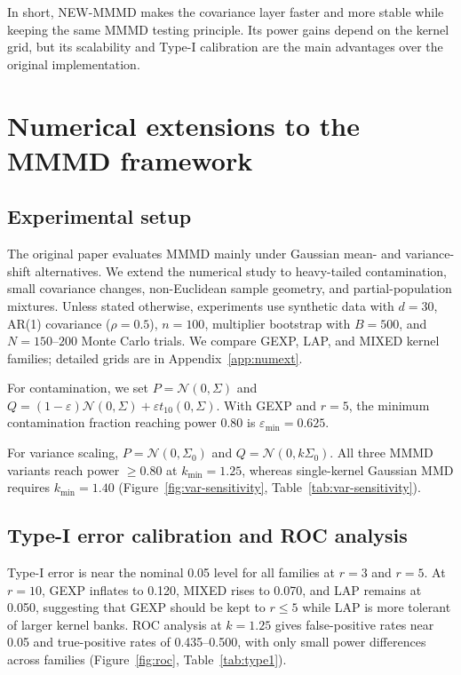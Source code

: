\documentclass[12pt]{article}
\begin{document}
In short, NEW-MMMD makes the covariance layer faster and more stable while keeping the same MMMD testing principle. Its power gains depend on the kernel grid, but its scalability and Type-I calibration are the main advantages over the original implementation.

\section{Numerical extensions to the MMMD framework}

\subsection{Experimental setup}

The original paper evaluates MMMD mainly under Gaussian mean- and variance-shift alternatives. We extend the numerical study to heavy-tailed contamination, small covariance changes, non-Euclidean sample geometry, and partial-population mixtures. Unless stated otherwise, experiments use synthetic data with $d=30$, AR(1) covariance ($\rho=0.5$), $n=100$, multiplier bootstrap with $B=500$, and $N=150$--$200$ Monte Carlo trials. We compare GEXP, LAP, and MIXED kernel families; detailed grids are in Appendix~\ref{app:numext}.

For contamination, we set $P=\mathcal{N}(0,\Sigma)$ and $Q=(1-\varepsilon)\mathcal{N}(0,\Sigma)+\varepsilon t_{10}(0,\Sigma)$. With GEXP and $r=5$, the minimum contamination fraction reaching power 0.80 is $\varepsilon_{\min}=0.625$.

For variance scaling, $P=\mathcal{N}(0,\Sigma_0)$ and $Q=\mathcal{N}(0,k\Sigma_0)$. All three MMMD variants reach power $\geq0.80$ at $k_{\min}=1.25$, whereas single-kernel Gaussian MMD requires $k_{\min}=1.40$ (Figure~\ref{fig:var-sensitivity}, Table~\ref{tab:var-sensitivity}).

\subsection{Type-I error calibration and ROC analysis}

Type-I error is near the nominal 0.05 level for all families at $r=3$ and $r=5$. At $r=10$, GEXP inflates to 0.120, MIXED rises to 0.070, and LAP remains at 0.050, suggesting that GEXP should be kept to $r\leq5$ while LAP is more tolerant of larger kernel banks. ROC analysis at $k=1.25$ gives false-positive rates near 0.05 and true-positive rates of 0.435--0.500, with only small power differences across families (Figure~\ref{fig:roc}, Table~\ref{tab:type1}).
\end{document}
